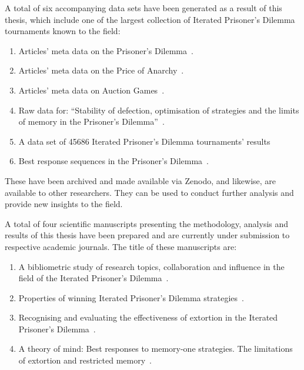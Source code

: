 A total of six accompanying data sets have been generated as a result of this thesis,
which include one of the largest collection of Iterated Prisoner's Dilemma
tournaments known to the field:

\begin{enumerate}
    \item Articles' meta data on the Prisoner's Dilemma~\cite{pd_data_2018}.
    \item Articles' meta data on the Price of Anarchy~\cite{anarchy_data_2018}.
    \item Articles' meta data on Auction Games~\cite{auction_data_2018}.
    \item Raw data for: ``Stability of defection, optimisation of strategies and
    the limits of memory in the Prisoner's Dilemma''~\cite{glynatsi2019}.
    \item A data set of 45686 Iterated Prisoner's Dilemma tournaments' results~\cite{Glynatsi2019_meta, Glynatsi2019_meta_raw_data}
    \item Best response sequences in the Prisoner's Dilemma~\cite{Glynatsi2020_sequences}.
\end{enumerate}

These have been archived and made available via Zenodo, and likewise, are
available to other researchers. They can be used to conduct further analysis and
provide new insights to the field.

A total of four scientific manuscripts presenting the methodology, analysis and
results of this thesis have been prepared and are currently under submission to
respective academic journals. The title of these manuscripts are:

\begin{enumerate}
    \item A bibliometric study of research topics, collaboration and influence
    in the field of the Iterated Prisoner's Dilemma~\cite{Glynatsi2019_bibliometric}.
    \item Properties of winning Iterated Prisoner's Dilemma
    strategies~\cite{Glynatsi2020meta_article}.
    \item Recognising and evaluating the effectiveness of extortion in the
    Iterated Prisoner's Dilemma~\cite{Knight2019}.
    \item A theory of mind: Best responses to memory-one strategies.
    The limitations of extortion and restricted memory~\cite{Glynatsi2019theory}.
\end{enumerate}

